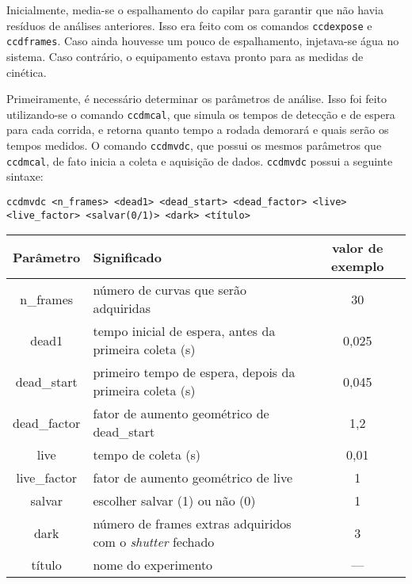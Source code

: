 			Inicialmente, media-se o espalhamento do capilar para garantir que não havia resíduos de análises anteriores. Isso era feito com os comandos \texttt{ccdexpose} e \texttt{ccdframes}. Caso ainda houvesse um pouco de espalhamento, injetava-se água no sistema. Caso contrário, o equipamento estava pronto para as medidas de cinética.
			
			
			Primeiramente, é necessário determinar os parâmetros de análise. Isso foi feito utilizando-se o comando \texttt{ccdmcal}, que simula os tempos de detecção e de espera para cada corrida, e retorna quanto tempo a rodada demorará e quais serão os tempos medidos. O comando \texttt{ccdmvdc}, que possui os mesmos parâmetros que \texttt{ccdmcal}, de fato inicia a coleta e aquisição de dados. \texttt{ccdmvdc} possui a seguinte sintaxe:
			
			\begin{center}
				\texttt{ccdmvdc <n\_frames> <dead1> <dead\_start> <dead\_factor> <live>\\ <live\_factor> 	<salvar(0/1)> <dark> <título>}
			\end{center}

			\begin{table}[H]
				{\begin{tabular}{c p{} c}
					\toprule
					 Parâmetro   & \centering Significado                                                     & valor de exemplo \\ \midrule
					 n\_frames   & \centering número de curvas que serão adquiridas                           & 30               \\
					   dead1     & \centering tempo inicial de espera, antes da primeira coleta (s)           & 0,025            \\
					dead\_start  & \centering primeiro tempo de espera, depois da primeira coleta (s)         & 0,045            \\
					dead\_factor & \centering fator de aumento geométrico de dead\_start                      & 1,2              \\
					    live     & \centering tempo de coleta (s)                                             & 0,01             \\
					live\_factor & \centering fator de aumento geométrico de live                             & 1                \\
					   salvar    & \centering escolher salvar (1) ou não (0)                                  & 1                \\
					    dark     & \centering número de frames extras adquiridos com o \emph{shutter} fechado & 3                \\
					   título    & \centering nome do experimento                                             & ---              \\ \bottomrule
				\end{tabular}}%
			{}
			\end{table}
			
